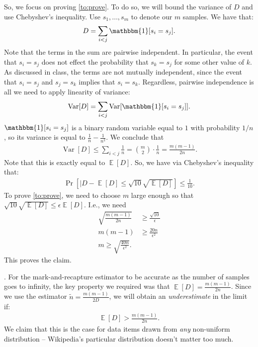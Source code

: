\documentclass[11pt]{article}
\DeclareMathOperator*{\E}{\mathbb{E}}
\DeclareMathOperator{\var}{Var}
\begin{document}
So, we focus on proving \eqref{to:prove}. To do so, we will bound the variance of $D$ and use Chebyshev's inequality. Use $s_1, \ldots, s_m$ to denote our $m$ samples. We have that:
\begin{align*}
	D = \sum_{i < j} \mathbbm{1}[s_i = s_j].
\end{align*}
Note that the terms in the sum are pairwise independent. In particular, the event that $s_i = s_j$ does not effect the probability that $s_k = s_j$ for some other value of $k$. As discussed in class, the terms are not mutually independent, since the event that $s_i = s_j$ and $s_j = s_k$ implies that $s_i = s_k$. Regardless, pairwise independence is all we need to apply linearity of variance: 
\begin{align*}
	\var[D] = \sum_{i < j} \var[\mathbbm{1}[s_i = s_j]].
\end{align*}
$\mathbbm{1}[s_i = s_j]$ is a binary random variable equal to $1$ with probability $1/n$, so its variance is equal to $\frac{1}{n} - \frac{1}{n^2}$. We conclude that 
\begin{align*}
	\var[D] \leq \sum_{i < j} \frac{1}{n} = \binom{m}{2}\cdot \frac{1}{n} = \frac{m(m-1)}{2n}.
\end{align*}
Note that this is exactly equal to $\E[D]$. So, we have via Chebyshev's inequality that:
\begin{align*}
	\Pr\left[|D - \E[D] \leq \sqrt{10}\sqrt{\E[D]}\right] \leq \frac{1}{10}.
\end{align*}
To prove \eqref{to:prove}, we need to choose $m$ large enough so that $\sqrt{10}\sqrt{\E[D]} \leq \epsilon \E[D]$. I.e., we need
\begin{align*}
	\sqrt{\frac{m(m-1)}{2n}} &\geq \frac{\sqrt{10}}{\epsilon}\\
	m(m-1) &\geq \frac{20 n}{\epsilon^2} \\
	m \geq \sqrt{\frac{40n}{\epsilon^2}}.
\end{align*}
This proves the claim.

\smallskip{}.\hspace{1em} For the mark-and-recapture estimator to be accurate as the number of samples goes to infinity, the key property we required was that $\E[D] = \frac{m(m-1)}{2n}$. Since we use the estimator $\tilde{n} = \frac{m(m-1)}{2D}$, we will obtain an \emph{underestimate} in the limit if: 
\begin{align*}
\E[D] > \frac{m(m-1)}{2n}.
\end{align*}
We claim that this is the case for data items drawn from \emph{any} non-uniform distribution -- Wikipedia's particular distribution doesn't matter too much. 
\end{document}
